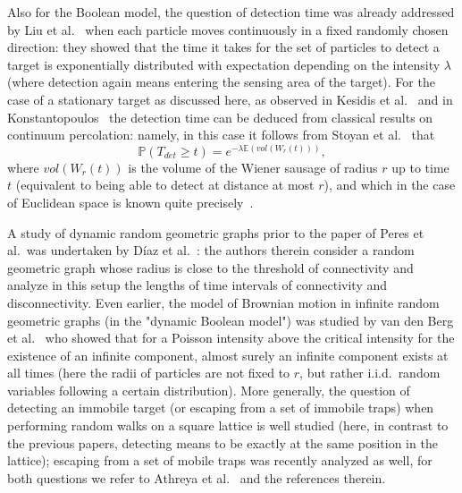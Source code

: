 \documentclass[12pt]{article}
\newcommand{\EE}{\mathbb{E}}
\renewcommand{\P}{\mathbb{P}}
\begin{document}
Also for the Boolean model, the question of detection time was already addressed by Liu et al.~\cite{Liu} when each particle moves continuously in a fixed randomly chosen direction: they showed that the time it takes for the set of particles to detect a target is exponentially distributed with expectation depending on the intensity $\lambda$ (where detection again means entering the sensing area of the target). For the case of a stationary target as discussed here, as observed in Kesidis et al.~\cite{Kesidis} and in Konstantopoulos~\cite{Konstant} the detection time can be deduced
from classical results on continuum percolation: namely, in this case it follows from Stoyan et al.~\cite{Stoyan} that
$$
\P{(T_{det} \ge t)} = e^{-\lambda \EE(vol(W_r(t)))},
$$
where $vol(W_r(t))$ is the volume of the Wiener sausage of radius $r$ up to time $t$ (equivalent to being able to detect at distance at most $r$), and which in the case of Euclidean space is known quite precisely~\cite{Spitzer, Bere}. %


A study of dynamic random geometric graphs prior to the paper of Peres et al.~was undertaken by D\'{i}az et al.~\cite{DMP09}: the authors therein consider a random geometric graph whose radius is close to the threshold of connectivity and analyze in this setup the lengths of time intervals of connectivity and disconnectivity. Even earlier, the model of Brownian motion in infinite random geometric graphs (in the "dynamic Boolean model") was studied by van den Berg et al.~\cite{vdBerg} who showed that for a Poisson intensity above the critical intensity for the existence of an infinite component, almost surely an infinite component exists at all times (here the radii of particles are not fixed to $r$, but rather i.i.d.~random variables following a certain distribution).
More generally, the question of detecting an immobile target (or escaping from a set of immobile traps) when performing random walks on a square lattice is well studied (here, in contrast to the previous papers, detecting means to be exactly at the same position in the lattice); escaping from a set of mobile traps was recently analyzed as well, for both questions we refer to Athreya et al.~\cite{Athreya} and the references therein.
\end{document}
